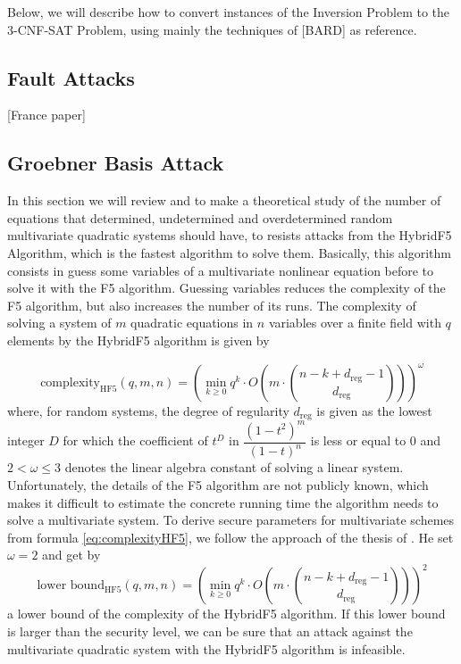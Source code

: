 Below, we will describe how to convert instances of the Inversion Problem to the 3-CNF-SAT Problem, using mainly the techniques of [BARD] as reference.


\subsection{Fault Attacks}

[France paper]
\subsection{Groebner Basis Attack}

In this section we will review and to make a theoretical study of the number of equations that determined, undetermined and overdetermined random multivariate quadratic systems should have, to resists attacks from the HybridF5 Algorithm, which is the fastest algorithm to solve them. Basically, this algorithm consists in guess some variables of a multivariate nonlinear equation before to solve it with the F5 algorithm. Guessing variables reduces the complexity of the F5 algorithm, but also increases the number of its runs. 
The complexity of solving a system of $m$ quadratic equations in $n$ variables over a finite field with $q$ elements by the HybridF5 algorithm is given by

\begin{equation}
 \text{complexity}_{\text{HF5}}(q,m,n)= \left(\min_{k\geq 0}q^{k}\cdot O\left(m\cdot \binom {n-k+d_{\text{reg}}-1} {d_{\text{reg}}}\right)\right)^\omega
 \label{eq:complexityHF5}
\end{equation}
where, for random systems, the degree of regularity $d_{\text{reg}}$ is given as the lowest integer $D$ for which the coefficient of $t^D$ in $\dfrac{(1-t^2)^m}{(1-t)^n}$ is less or equal to 0 and $2 < \omega \leq 3$ denotes the linear algebra constant of solving a linear system.
Unfortunately, the details of the F5 algorithm are not publicly known, which makes it difficult to estimate the concrete running time the algorithm needs to solve a multivariate system. To derive secure parameters for multivariate schemes from formula \eqref{eq:complexityHF5}, we follow the approach of the thesis of \cite{AlbrechtPetzoldt2013}. He set $\omega = 2$ and get by 
\begin{equation}
 \text{lower bound}_{\text{HF5}}(q,m,n)= \left(\min_{k\geq 0}q^{k}\cdot O\left(m\cdot \binom {n-k+d_{\text{reg}}-1} {d_{\text{reg}}}\right)\right)^2
\label{eq:complexityHF5w}
\end{equation}
a lower bound of the complexity of the HybridF5 algorithm. If this lower bound is larger than the security level, we can be sure that an attack against the multivariate quadratic system with the HybridF5 algorithm is infeasible.


